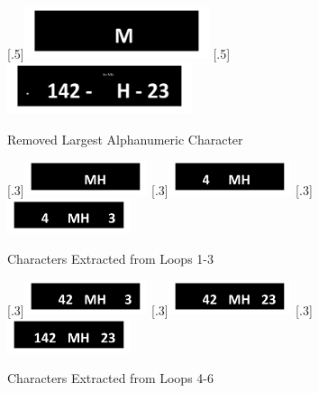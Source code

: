 \documentclass[a4paper]{article}
\begin{document}
	\begin{figure}[H]
		\centering
		[.5\linewidth]{\includegraphics[height=1.5cm]{Results/Q2/NumPlate5/qanumber_plate_5BigChar.jpg}}%
		[.5\linewidth]{\includegraphics[height=1.5cm]{Results/Q2/NumPlate5/qanumber_plate_5Remain.jpg}}%
		\caption{Removed Largest Alphanumeric Character}
		\label{fig:}
	\end{figure}
	\begin{figure}[H]
		\centering
		[.3\linewidth]{\includegraphics[height=1cm]{Results/Q2/NumPlate5/qanumber_plate_5Added1.jpg}}%
		[.3\linewidth]{\includegraphics[height=1cm]{Results/Q2/NumPlate5/qanumber_plate_5Added2.jpg}}%
		[.3\linewidth]{\includegraphics[height=1cm]{Results/Q2/NumPlate5/qanumber_plate_5Added3.jpg}}%
		\caption{Characters Extracted from Loops 1-3}
		\label{fig:}
	\end{figure}
	\begin{figure}[H]
		\centering
		[.3\linewidth]{\includegraphics[height=1cm]{Results/Q2/NumPlate5/qanumber_plate_5Added4.jpg}}%
		[.3\linewidth]{\includegraphics[height=1cm]{Results/Q2/NumPlate5/qanumber_plate_5Added5.jpg}}%
		[.3\linewidth]{\includegraphics[height=1cm]{Results/Q2/NumPlate5/qanumber_plate_5Added6.jpg}}%
		\caption{Characters Extracted from Loops 4-6}
		\label{fig:}
	\end{figure}
\end{document}
